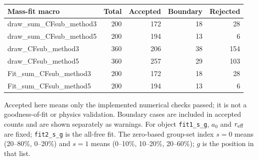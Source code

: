 \documentclass[11pt,a4paper]{article}
\begin{document}
{\small\begin{longtable}{lrrrr}\hline Mass-fit macro & Total & Accepted & Boundary & Rejected\\\hline\endhead
draw\_sum\_CFsub\_method3 & 200 & 172 & 18 & 28\\
draw\_sum\_CFsub\_method5 & 200 & 194 & 13 & 6\\
draw\_CFsub\_method3 & 360 & 206 & 38 & 154\\
draw\_CFsub\_method5 & 360 & 257 & 29 & 103\\
Fit\_sum\_CFsub\_method3 & 200 & 172 & 18 & 28\\
Fit\_sum\_CFsub\_method5 & 200 & 194 & 13 & 6\\
\hline\end{longtable}}
Accepted here means only the implemented numerical checks passed; it is not a goodness-of-fit or physics validation. Boundary cases are included in accepted counts and are shown separately as warnings.
For object \texttt{fit1\_s\_g}, $a_0$ and $r_{\rm eff}$ are fixed; \texttt{fit2\_s\_g} is the all-free fit. The zero-based group-set index $s=0$ means (20--80\%, 0--20\%) and $s=1$ means (0--10\%, 10--20\%, 20--60\%); $g$ is the position in that list.
\end{document}
